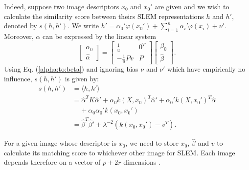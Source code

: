 Indeed, suppose two image descriptors $x_0$ and $x_0'$ are given and we wish to calculate the similarity score between theirs SLEM representations $h$ and $h'$, denoted by $s(h,h')$. 
We write $h'=\alpha_0'\varphi(x_0')+\sum_{i=1}^n \alpha_i'\varphi (x_i)+\nu'$. 
Moreover, $\alpha$ can be expressed by the linear system
\begin{equation}
\begin{bmatrix} \alpha_0 \\ \hat{\alpha} \end{bmatrix} = \begin{bmatrix} \frac{1}{u} & 0^T \\-\frac{1}{u}Pv & P  \end{bmatrix} \begin{bmatrix}\beta_0 \\ \hat{\beta} \end{bmatrix}.\label{alpha:to:beta}
\end{equation}
Using Eq. (\ref{alpha:to:beta}) and ignoring bias $\nu$ and $\nu'$ which have empirically no influence, $s(h,h')$ is given by:
\begin{equation}
\begin{split}
s(h,h') & = \langle h, h'\rangle \\
		& = \hat{\alpha}^{T} K\hat{\alpha}'+\alpha_0k(X, x_0)^T\hat{\alpha}'+\alpha_0'k(X, x_0')^T\hat{\alpha} \\
		& \ \ \ \ \ +\alpha_0\alpha_0'k(x_0,x_0')\\
		& = \hat{\beta}^T\hat{\beta}'+\lambda^{-2}(k(x_0,x_0')-v^T).
\end{split}
\end{equation}

For a given image whose descriptor is $x_0$, we need to store $x_0$, $\hat{\beta}$ and $v$ to calculate its matching score to whichever other image for SLEM. Each image depends therefore on a vector of $p+2r$ dimensions .


